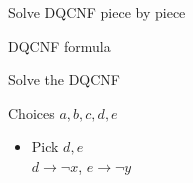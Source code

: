 \documentclass[xcolor=table	]{beamer}
\begin{document}
\begin{frame}{Solve DQCNF piece by piece}
\begin{alertblock}{DQCNF formula}
{}
\end{alertblock}

\begin{exampleblock}{Solve the DQCNF}
	{    {Choices $a, b, c, d, e$ \newline} 
		\pause \pause
	\only<3->	{\begin{itemize}
		\only \item Pick $d, e$\\
		\pause 
		  $d \to \neg x$, $e \to \neg y$ \newline 
		\pause   
		\end{itemize}
	}
	}
\end{exampleblock}

\end{frame}
\end{document}
